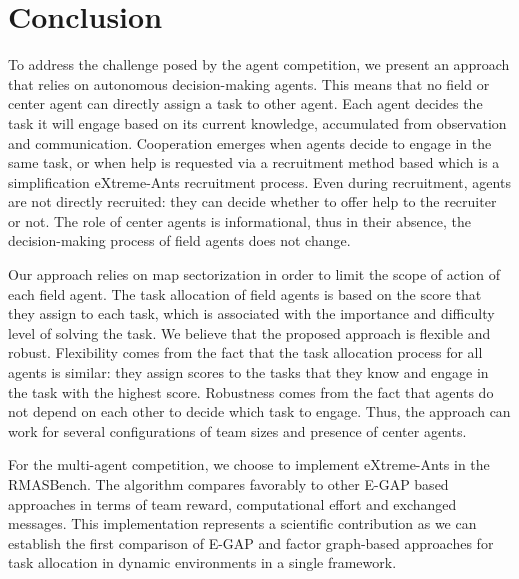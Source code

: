 \section{Conclusion}

To address the challenge posed by the agent competition, we present an approach that relies on autonomous decision-making agents. This means that no field or center agent can directly assign a task to other agent. Each agent decides the task it will engage based on its current knowledge, accumulated from observation and communication. Cooperation emerges when agents decide to engage in the same task, or when help is requested via a recruitment method based which is a simplification eXtreme-Ants recruitment process. Even during recruitment, agents are not directly recruited: they can decide whether to offer help to the recruiter or not. The role of center agents is informational, thus in their absence, the decision-making process of field agents does not change.

Our approach relies on map sectorization in order to limit the scope of action of each field agent. The task allocation of field agents is based on the score that they assign to each task, which is associated with the importance and difficulty level of solving the task. We believe that the proposed approach is flexible and robust. Flexibility comes from the fact that the task allocation process for all agents is similar: they assign scores to the tasks that they know and engage in the task with the highest score. Robustness comes from the fact that agents do not depend on each other to decide which task to engage. Thus, the approach can work for several configurations of team sizes and presence of center agents.

For the multi-agent competition, we choose to implement eXtreme-Ants in the RMASBench. The algorithm compares favorably to other E-GAP based approaches in terms of team reward, computational effort and exchanged messages. This implementation represents a scientific contribution as we can establish the first comparison of E-GAP and factor graph-based approaches for task allocation in dynamic environments in a single framework.

